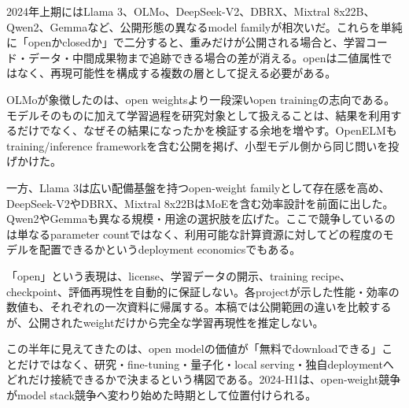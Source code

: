 
2024年上期にはLlama 3、OLMo、DeepSeek-V2、DBRX、Mixtral 8x22B、Qwen2、Gemmaなど、公開形態の異なるmodel familyが相次いだ。これらを単純に「openかclosedか」で二分すると、重みだけが公開される場合と、学習コード・データ・中間成果物まで追跡できる場合の差が消える。openは二値属性ではなく、再現可能性を構成する複数の層として捉える必要がある。\autocite{src-0395647db4a8,src-05f98c47f3e8,src-3d2fa83e273d,src-461ae12066d1,src-d9d69089eb6a,src-f9616f30e8f5,src-ff36b1c2ef30}


OLMoが象徴したのは、open weightsより一段深いopen trainingの志向である。モデルそのものに加えて学習過程を研究対象として扱えることは、結果を利用するだけでなく、なぜその結果になったかを検証する余地を増やす。OpenELMもtraining/inference frameworkを含む公開を掲げ、小型モデル側から同じ問いを投げかけた。\autocite{src-3d2fa83e273d,src-4d404eabda6e}


一方、Llama 3は広い配備基盤を持つopen-weight familyとして存在感を高め、DeepSeek-V2やDBRX、Mixtral 8x22BはMoEを含む効率設計を前面に出した。Qwen2やGemmaも異なる規模・用途の選択肢を広げた。ここで競争しているのは単なるparameter countではなく、利用可能な計算資源に対してどの程度のモデルを配置できるかというdeployment economicsでもある。\autocite{src-0395647db4a8,src-05f98c47f3e8,src-461ae12066d1,src-d9d69089eb6a,src-f9616f30e8f5,src-ff36b1c2ef30}


\begin{claimboundary}
「open」という表現は、license、学習データの開示、training recipe、checkpoint、評価再現性を自動的に保証しない。各projectが示した性能・効率の数値も、それぞれの一次資料に帰属する。本稿では公開範囲の違いを比較するが、公開されたweightだけから完全な学習再現性を推定しない。\autocite{src-37f17fc6592f,src-3d2fa83e273d,src-8ccec4bc715c,src-d9d69089eb6a,src-f9616f30e8f5}
\end{claimboundary}

この半年に見えてきたのは、open modelの価値が「無料でdownloadできる」ことだけではなく、研究・fine-tuning・量子化・local serving・独自deploymentへどれだけ接続できるかで決まるという構図である。2024-H1は、open-weight競争がmodel stack競争へ変わり始めた時期として位置付けられる。\autocite{src-3d2fa83e273d,src-4d404eabda6e,src-d9d69089eb6a,src-f9616f30e8f5}
